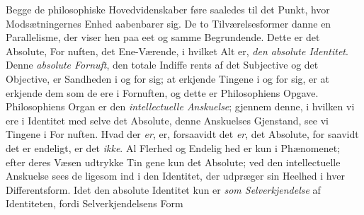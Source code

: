 \documentclass[12pt,a4paper]{book}
\begin{document}
Begge de philosophiske Hovedvidenskaber føre saaledes
til det Punkt, hvor Modsætningernes Enhed aabenbarer sig.
De to Tilværelsesformer danne en Parallelisme, der viser hen
paa eet og samme Begrundende. Dette er det Absolute, For\-%
nuften, det Ene-Værende, i hvilket Alt er, \emph{den absolute
Identitet}. Denne \emph{absolute Fornuft}, den totale Indiffe\-%
rents af det Subjective og det Objective, er Sandheden i og
for sig; at erkjende Tingene i og for sig, er at erkjende dem
som de ere i Fornuften, og dette er Philosophiens Opgave.
Philosophiens Organ er den \emph{intellectuelle Anskuelse};
gjennem denne, i hvilken vi ere i Identitet med selve det
Absolute, denne Anskuelses Gjenstand, see vi Tingene i For\-%
nuften. Hvad der \emph{er}, er, forsaavidt det \emph{er}, det Absolute, for\-%
saavidt det er endeligt, er det \emph{ikke}. Al Flerhed og Endelig\-%
hed er kun i Phænomenet; efter deres Væsen udtrykke Tin\-%
gene kun det Absolute; ved den intellectuelle Anskuelse sees
de ligesom ind i den Identitet, der udpræger sin Heelhed i
hver Differentsform. Idet den absolute Identitet kun er \emph{som
Selverkjendelse} af Identiteten, fordi Selverkjendelsens Form
\end{document}
